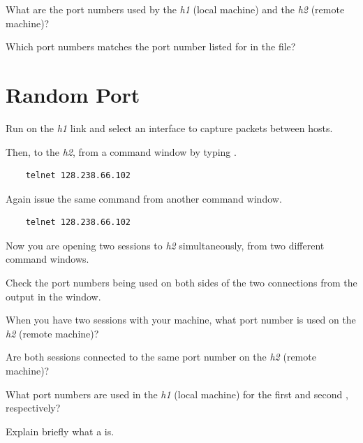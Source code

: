 \documentclass{../UTNetLab}
\begin{document}
\begin{report}
    \item What are the port numbers used by the \textit{h1} (local machine) and the \textit{h2} (remote machine)?

    \item Which port numbers matches the port number listed for  in the  file?
\end{report}

\section{Random Port}
Run  on the \textit{h1} link and select an interface to capture packets between hosts.

Then,  to the \textit{h2}, from a command window by typing .

\begin{lstlisting}
	telnet 128.238.66.102
\end{lstlisting}

Again issue the same  command from another  command window.

\begin{lstlisting}
	telnet 128.238.66.102
\end{lstlisting}

Now you are opening two  sessions to \textit{h2} simultaneously, from two different command windows.

Check the port numbers being used on both sides of the two connections from the output in the  window.

\begin{report}
    \item When you have two  sessions with your machine, what port number is used on the \textit{h2} (remote machine)?

    \item Are both sessions connected to the same port number on the \textit{h2} (remote machine)?

    \item What port numbers are used in the \textit{h1} (local machine) for the first and second , respectively?

    \item Explain briefly what a  is.
\end{report}
\end{document}
